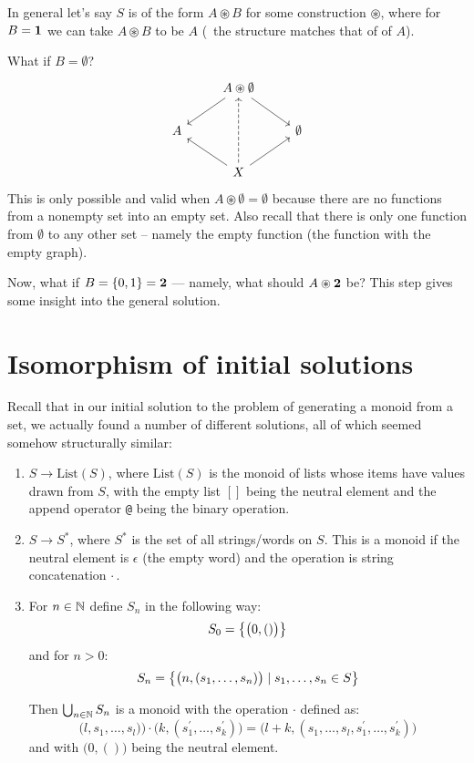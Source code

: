     In general let's say $S$ is of the form $A \circledast B$ for some
    construction $\circledast$, where for $B = \mathbf{ 1 }$ we can take 
    $A \circledast B$ to be $A$ (\ie~the structure matches that of of $A$).
    
    What if $B = \emptyset$?
    $$
    \begin{tikzcd}
        {} & A \circledast \emptyset \arrow[ld] \arrow[rd] & {} \\
        A
        & {}
        &
        \emptyset
        \\
        {} & X \arrow[uu, dashed] \arrow[lu] \arrow[ru] & {}
    \end{tikzcd}
    $$
    This is only possible and valid when $A \circledast \emptyset = \emptyset$
    because there are no functions from a nonempty set into an empty set. Also
    recall that there is only one function from $\emptyset$ to any other set --
    namely the empty function (the function with the empty graph).
    
    Now, what if $B = \{ 0, 1 \} = \mathbf{ 2 }$ --- namely, what should $A
    \circledast \mathbf{ 2 }$ be? This step gives some insight into the general
    solution.
    
    \section{Isomorphism of initial solutions}
    
    Recall that in our initial solution to the problem of generating a monoid
    from a set, we actually found a number of different solutions, all of which
    seemed somehow structurally similar:
    
    \begin{enumerate}
    
    \item $S \to \mathrm{List}(S)$, where $\mathrm{List}(S)$ is the monoid of lists
    whose items have values drawn from $S$, with the empty list $[]$ being the
    neutral element and the append operator \texttt{@} being the binary
    operation.
    
    \item $S \to S^\ast$, where $S^\ast$ is the set of all strings/words on $S$.
    This is a monoid if the neutral element is $\epsilon$ (the empty word) and the
    operation is string concatenation $\cdot$\,.
    
    \item For $n \in \mathbb{N}$ define $S_n$ in the following way:
    \[
    S_0 = \big\{  \big(0, ()\big)  \big\}
    \]
    and for $n > 0$:
    \[
    S_n 
    = \big\{ \big(n, (s_1, \ldots, s_n)\big) \mid s_1, \ldots, s_n \in S \big\}
    \]
    
    Then $\bigcup_{n\in\mathbb{N}} S_n$ is a monoid with the operation $\cdot$ defined
    as: 
    \[
    \big(l, s_1, \ldots, s_l)\big) 
    \cdot 
    \big(k, (s_1^\prime, \ldots, s_k^\prime)\big) 
    = 
    \big(l + k, (s_1, \ldots, s_l, s_1^\prime, \ldots, s_k^\prime)\big)
    \]
    and with $\big(0, ()\big)$ being the neutral element.
    
    \end{enumerate}
    
